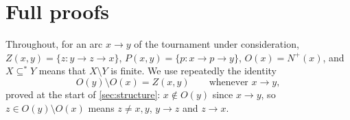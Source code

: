 \documentclass[11pt,a4paper]{article}
\theoremstyle{plain}
\theoremstyle{definition}
\theoremstyle{remark}
\newcommand{\fin}{\subseteq^{\ast}}
\begin{document}
\appendix

\section{Full proofs}\label{app:proofs}

Throughout, for an arc $x\to y$ of the tournament under consideration, $Z(x,y)=\{z: y\to z\to x\}$, $P(x,y)=\{p: x\to p\to y\}$, $O(x)=N^+(x)$, and $X\fin Y$ means that $X\setminus Y$ is finite. We use repeatedly the identity
\begin{equation}\label{eq:Z}
 O(y)\setminus O(x)=Z(x,y)\qquad\text{whenever }x\to y,
\end{equation}
proved at the start of \cref{sec:structure}: $x\notin O(y)$ since $x\to y$, so $z\in O(y)\setminus O(x)$ means $z\ne x,y$, $y\to z$ and $z\to x$.
\end{document}
